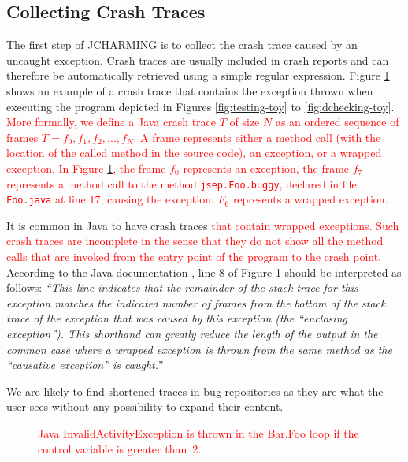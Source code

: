 \documentclass[times, doublespace]{smrauth}
\newcommand{\red}[1]{\textcolor{red}{#1}}
\begin{document}
\subsection{Collecting Crash Traces}

The first step of JCHARMING is to collect the crash trace
caused by an uncaught exception. Crash traces are usually included in crash reports and can therefore be automatically
retrieved using a simple regular expression.
Figure \ref{fig:jcarming-traces} shows an example of a crash trace that contains the
exception thrown when executing the program depicted in
Figures \ref{fig:testing-toy} to \ref{fig:dchecking-toy}.
\red{More formally, we define a Java crash trace $T$ of size $N$ as an ordered sequence of frames $T={f_0, f_1, f_2, ..., f_N}$. A frame represents either a method call (with the location of the called method in the source code), an exception, or a wrapped exception.
In Figure \ref{fig:jcarming-traces}, the frame $f_0$ represents an exception, the frame  $f_7$ represents a method call to the method \texttt{jsep.Foo.buggy}, declared in file \texttt{Foo.java} at  line 17, causing the exception. $F_6$ represents a wrapped exception.}

It is common in Java to have crash
traces \red{that contain wrapped exceptions.
Such crash traces are incomplete in the sense that they do not show all the method calls that are invoked from the entry point of the program to the crash point.}
According to the Java documentation \cite{Oracle2011}, line 8 of
Figure \ref{fig:jcarming-traces} should be interpreted as follows: {\it ``This line indicates
that the remainder of the stack trace for this exception
matches the indicated number of frames from the bottom of the
stack trace of the exception that was caused by this exception
(the ``enclosing exception''). This shorthand can greatly
reduce the length of the output in the common case where a
wrapped exception is thrown from the same method as the
``causative exception'' is caught.}''

We are likely to find shortened traces in bug repositories as
they are what the user sees without any possibility to expand
their content.


\begin{figure}
  \noindent{}
    \caption{\red{Java InvalidActivityException is thrown in the Bar.Foo loop if the control variable is greater than~2.}
    \label{fig:jcarming-traces}}
\end{figure}
\end{document}
